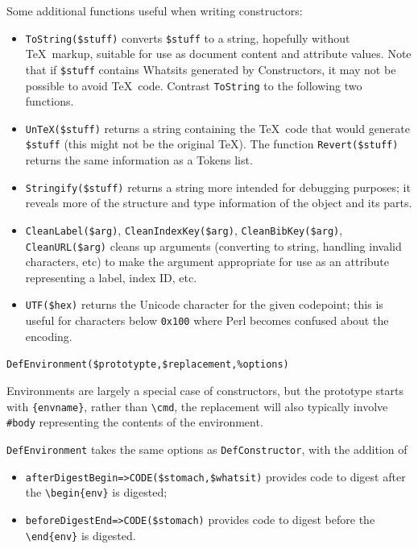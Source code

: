\documentclass{book}
\newcommand{\ltxcode}{\lstinline[style=latexml]}
\begin{document}
Some additional functions useful when writing constructors:
\begin{itemize}
\item \ltxcode|ToString($stuff)| converts \ltxcode|$stuff| to a string,
  hopefully without \TeX\ markup, suitable for use as document content
  and attribute values.  Note that if \ltxcode|$stuff| contains Whatsits
  generated by Constructors, it may not be possible to avoid \TeX\ code.
  Contrast \ltxcode|ToString| to the following two functions.
\item \ltxcode|UnTeX($stuff)| returns a string containing the \TeX\ code
  that would generate \ltxcode|$stuff| (this might not be the original \TeX).
  The function \ltxcode|Revert($stuff)| returns the same information as a Tokens list.
\item \ltxcode|Stringify($stuff)| returns a string more intended
  for debugging purposes; it reveals more of the structure and type information
  of the object and its parts.
\item \ltxcode|CleanLabel($arg)|,
   \ltxcode|CleanIndexKey($arg)|,
   \ltxcode|CleanBibKey($arg)|,
   \ltxcode|CleanURL($arg)|
  cleans up arguments (converting to string, handling invalid characters, etc)
  to make the argument appropriate for use as an attribute representing
  a label, index ID, etc.
\item \ltxcode|UTF($hex)| returns the Unicode character for the given
codepoint; this is useful for characters below \texttt{0x100} where
Perl becomes confused about the encoding.
\end{itemize}

\par\noindent \ltxcode|DefEnvironment($prototypte,$replacement,%
\par Environments are largely a special case of constructors,
but the prototype starts with \verb|{envname}|, rather than \verb|\cmd|,
the replacement will also typically involve \verb|#body| representing
the contents of the environment.

\texttt{DefEnvironment} takes the same options as  \texttt{DefConstructor},
with the addition of
\begin{itemize}
\item \ltxcode|afterDigestBegin=>CODE($stomach,$whatsit)|
provides code to digest after the \verb|\begin{env}| is digested;
\item \ltxcode|beforeDigestEnd=>CODE($stomach)|
provides code to digest before the \verb|\end{env}| is digested.
\end{itemize}
\end{document}
